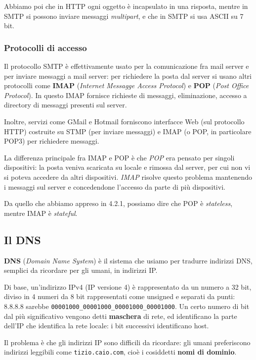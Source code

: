 \documentclass[a4paper,11pt]{article}
\begin{document}
Abbiamo poi che in HTTP ogni oggetto è incapsulato in una risposta, mentre in SMTP si possono inviare messaggi \textit{multipart}, e che in SMTP si usa ASCII su 7 bit.

\subsubsection{Protocolli di accesso}
Il protocollo SMTP è effettivamente usato per la comunicazione fra mail server e per inviare messaggi a mail server: per richiedere la posta dal server si usano altri protocolli come \textbf{IMAP} (\textit{Internet Messagge Access Protocol}) e \textbf{POP} (\textit{Post Office Protocol}).
In questo IMAP fornisce richieste di messaggi, eliminazione, accesso a directory di messaggi presenti sul server.

Inoltre, servizi come GMail e Hotmail forniscono interfacce Web (sul protocollo HTTP) costruite su STMP (per inviare messaggi) e IMAP (o POP, in particolare POP3) per richiedere messaggi. 

La differenza principale fra IMAP e POP è che \textit{POP} era pensato per singoli dispositivi: la posta veniva scaricata su locale e rimossa dal server, per cui non vi si poteva accedere da altri dispositivi.
\textit{IMAP} risolve questo problema mantenendo i messaggi sul server e concedendone l'accesso da parte di più dispositivi.

Da quello che abbiamo appreso in 4.2.1, possiamo dire che POP è \textit{stateless}, mentre IMAP è \textit{stateful}. 

\subsection{Il DNS}
\textbf{DNS} (\textit{Domain Name System}) è il sistema che usiamo per tradurre indirizzi DNS, semplici da ricordare per gli umani, in indirizzi IP.

Di base, un'indirizzo IPv4 (IP versione 4) è rappresentato da un numero a 32 bit, diviso in 4 numeri da 8 bit rappresentati come unsigned e separati da punti: 8.8.8.8 sarebbe \lstinline|00001000_00001000_00001000_00001000|.
Un certo numero di bit dal più significativo vengono detti \textbf{maschera} di rete, ed identificano la parte dell'IP che identifica la rete locale: i bit successivi identificano host.

Il problema è che gli indirizzi IP sono difficili da ricordare: gli umani preferiscono indirizzi leggibili come \lstinline|tizio.caio.com|, cioè i cosiddetti \textbf{nomi di dominio}.
\end{document}
